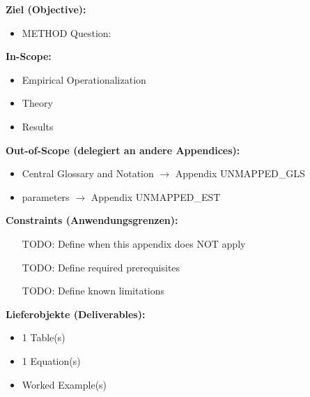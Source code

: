 

\begin{tcolorbox}[
    colback=orange!5!white,
    colframe=orange!75!black,
    title={\textbf{Appendix Scope: Ziel / In-Scope / Out-of-Scope / Constraints}},
    fonttitle=\bfseries
]

\textbf{Ziel (Objective):}
\begin{itemize}[nosep]
    \item METHOD Question:
\end{itemize}

\textbf{In-Scope:}
\begin{itemize}[nosep]
    \item Empirical Operationalization
    \item Theory
    \item Results
\end{itemize}

\textbf{Out-of-Scope (delegiert an andere Appendices):}
\begin{itemize}[nosep]
    \item Central Glossary and Notation $\rightarrow$ Appendix UNMAPPED_GLS
    \item parameters $\rightarrow$ Appendix UNMAPPED_EST
\end{itemize}

\textbf{Constraints (Anwendungsgrenzen):}
\begin{itemize}[nosep]
    \item [TODO: Define when this appendix does NOT apply]
    \item [TODO: Define required prerequisites]
    \item [TODO: Define known limitations]
\end{itemize}

\textbf{Lieferobjekte (Deliverables):}
\begin{itemize}[nosep]
    \item 1 Table(s)
    \item 1 Equation(s)
    \item Worked Example(s)
\end{itemize}

\end{tcolorbox}


